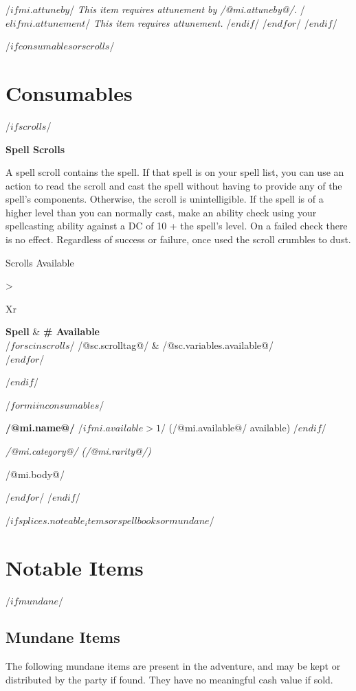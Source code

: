 \documentclass[10pt,twocolumn,twoside,openany]{book}
\begin{document}
/$if mi.attuneby $/ \textit{This item requires attunement by /@mi.attuneby@/.} 
/$elif mi.attunement $/ \textit{This item requires attunement.} /$endif$/
\vspace*{.1in}
/$ endfor $/
/$ endif $/

/$ if consumables or scrolls $/
\section*{Consumables}
/$ if scrolls $/
\label{magicitem_scrolls}
\centerline{\textbf{Spell Scrolls}}
A spell scroll contains the spell. If that spell is on your spell list, you can use an action to read
the scroll and cast the spell without having to provide any of the spell's components. Otherwise, the scroll is
unintelligible. If the spell is of a higher level than you can normally cast, make an ability check using your
spellcasting ability against a DC of 10 + the spell's level. On a failed check there is no effect.
Regardless of success or failure, once used the scroll crumbles to dust.

\begin{dndtable}{Scrolls Available}{>{\raggedright\arraybackslash}Xr}
\textbf{Spell} & \textbf{\# Available}\\
/$ for sc in scrolls $/
/@sc.scrolltag@/ & /@sc.variables.available@/\\
/$ endfor $/
\end{dndtable}
\vspace*{.1in}
/$endif $/

/$ for mi in consumables $/
\label{magicitem_/@mi.name@/}
\centerline{\textbf{/@mi.name@/} /$ if mi.available > 1$/ (/@mi.available@/ available) /$endif$/}
\centerline{\textit{/@mi.category@/ (/@mi.rarity@/)}} 
/@mi.body@/

\vspace*{.1in}
/$ endfor $/
/$ endif $/

/$ if splices.noteable_items or spellbooks or mundane $/
\section*{Notable Items}
/$ if mundane $/
\subsection{Mundane Items}
The following mundane items are present in the adventure, and may be kept or
distributed by the party if found. They have no meaningful cash value if sold.
 
\end{document}

